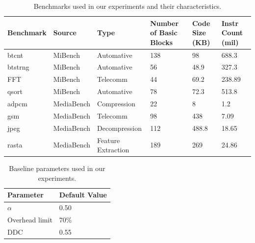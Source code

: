 \begin{table}
\begin{center}
\caption{Benchmarks used in our experiments and their characteristics.} 
\begin{tabular}{ p{1.2cm} p{2.2cm} p{2.2cm} p{1cm} p{0.5cm} p{0.6cm} }
 Benchmark& Source & Type & Number of Basic Blocks& Code Size (KB)& Instr Count (mil)\\
 \hline
 btcnt& MiBench \cite{MiBench:2001} & Automative &  138 &  98 &  688.3 \\
 btstrng& MiBench \cite{MiBench:2001} & Automative&  56 &  48.9 &  327.3 \\
 FFT& MiBench \cite{MiBench:2001} & Telecomm & 44 & 69.2 & 238.89 \\
 qsort& MiBench \cite{MiBench:2001} & Automative & 78 &  72.3 &  513.8 \\
 adpcm& MediaBench \cite{MediaBench:1997} & Compression & 22 & 8 & 1.2\\
 gsm& MediaBench \cite{MediaBench:1997} & Telecomm & 98  &  438   &  7.09  \\
 jpeg& MediaBench \cite{MediaBench:1997} & Decompression &  112  &  488.8  &  18.65  \\
 rasta& MediaBench \cite{MediaBench:1997} & Feature Extraction &  189  &   269  &  24.86   \\
\end{tabular}
\end{center}
\end{table}


\begin{table}
\begin{center}
\caption
{
Baseline parameters used in our experiments.
} 
\begin{tabular}{ p{2.5cm} p{2.5cm} }
 \textbf{Parameter}& \textbf{Default Value} \\
 \hline
 $\alpha$ & 0.50 \\
 Overhead limit & 70\% \\
 DDC & 0.55 \\
\end{tabular}
\end{center}
\end{table}


